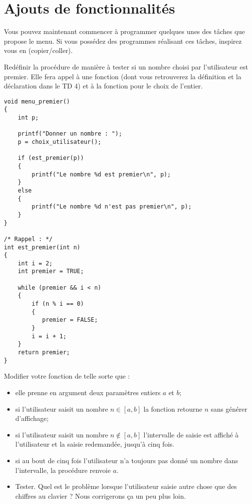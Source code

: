 \section{Ajouts de fonctionnalités}
Vous pouvez maintenant commencer à programmer quelques unes des
  tâches que propose le menu. Si vous possédez des programmes
  réalisant ces tâches, inspirez vous en (copier/coller).

\begin{lastenu}
    \item Redéfinir la procédure  de manière à tester
      si un nombre choisi par l'utilisateur est premier. Elle fera
      appel à une fonction 
  (dont vous retrouverez la définition et la déclaration dans le TD 4) et à la
  fonction  pour le choix de l'entier.
  \begin{correction}
{\footnotesize
\begin{verbatim}
void menu_premier()
{
    int p;

    printf("Donner un nombre : ");
    p = choix_utilisateur();
    
    if (est_premier(p))
    {
        printf("Le nombre %d est premier\n", p);
    }
    else
    {
        printf("Le nombre %d n'est pas premier\n", p);      
    }
}

/* Rappel : */
int est_premier(int n)
{
    int i = 2;
    int premier = TRUE;

    while (premier && i < n) 
    {   
        if (n % i == 0) 
        {
           premier = FALSE;
        }
        i = i + 1;
    }
    return premier;
}
\end{verbatim}
}
  \end{correction}
\item Modifier votre fonction  de telle sorte
  que :
  \begin{itemize}
  \item elle prenne en argument deux paramètres entiers $a$ et $b$;
  \item si l'utilisateur saisit un nombre $n\in [a, b]$ la fonction
    retourne $n$ sans générer d'affichage;
\item si l'utilisateur saisit un nombre $n\not\in [a, b]$ l'intervalle
  de saisie est affiché à l'utilisateur et la saisie redemandée,
  jusqu'à cinq fois.
\item si au bout de cinq fois l'utilisateur n'a toujours pas donné un
  nombre dans l'intervalle, la procédure renvoie $a$.
\item Tester. Quel est le problème lorsque l'utilisateur saisie autre chose
  que des chiffres au clavier ? Nous corrigerons ça un peu plus loin.
\end{itemize}


\end{lastenu}
